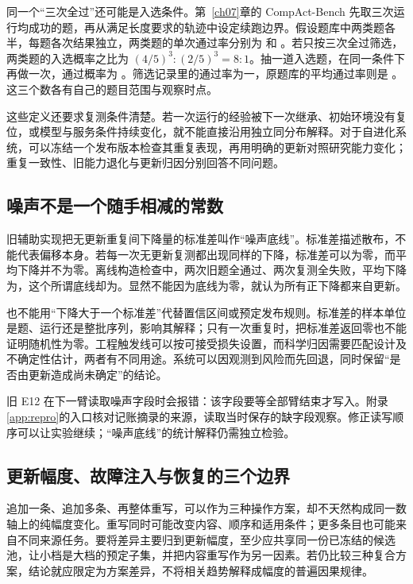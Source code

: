 同一个“三次全过”还可能是入选条件。第~\ref{ch07}章的 CompAct-Bench 先取三次运行均成功的题，再从满足长度要求的轨迹中设定续跑边界\cite{compact-bench-2611}。假设题库中两类题各半，每题各次结果独立，两类题的单次通过率分别为  和 。若只按三次全过筛选，两类题的入选概率之比为 $(4/5)^3:(2/5)^3=8:1$。抽一道入选题，在同一条件下再做一次，通过概率为 。筛选记录里的通过率为一，原题库的平均通过率则是 。这三个数各有自己的题目范围与观察时点。

这些定义还要求复测条件清楚。若一次运行的经验被下一次继承、初始环境没有复位，或模型与服务条件持续变化，就不能直接沿用独立同分布解释。对于自进化系统，可以冻结一个发布版本检查其重复表现，再用明确的更新对照研究能力变化；重复一致性、旧能力退化与更新归因分别回答不同问题。

\subsection{噪声不是一个随手相减的常数}

旧辅助实现把无更新重复间下降量的标准差叫作“噪声底线”。标准差描述散布，不能代表偏移本身。若每一次无更新复测都出现同样的下降，标准差可以为零，而平均下降并不为零。离线构造检查中，两次旧题全通过、两次复测全失败，平均下降为，这个所谓底线却为。显然不能因为底线为零，就认为所有正下降都来自更新。

也不能用“下降大于一个标准差”代替置信区间或预定发布规则。标准差的样本单位是题、运行还是整批序列，影响其解释；只有一次重复时，把标准差返回零也不能证明随机性为零。工程触发线可以按可接受损失设置，而科学归因需要匹配设计及不确定性估计，两者有不同用途。系统可以因观测到风险而先回退，同时保留“是否由更新造成尚未确定”的结论。

旧 E12 在下一臂读取噪声字段时会报错：该字段要等全部臂结束才写入。附录\ref{app:repro}的入口核对记账摘录的来源，读取当时保存的缺字段观察。修正读写顺序可以让实验继续；“噪声底线”的统计解释仍需独立检验。

\subsection{更新幅度、故障注入与恢复的三个边界}

追加一条、追加多条、再整体重写，可以作为三种操作方案，却不天然构成同一数轴上的纯幅度变化。重写同时可能改变内容、顺序和适用条件；更多条目也可能来自不同来源任务。要将差异主要归到更新幅度，至少应共享同一份已冻结的候选池，让小档是大档的预定子集，并把内容重写作为另一因素。若仍比较三种复合方案，结论就应限定为方案差异，不将相关趋势解释成幅度的普遍因果规律。

